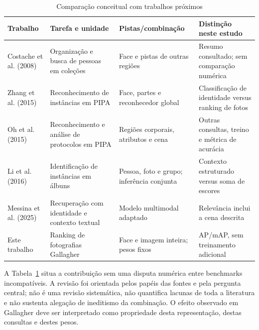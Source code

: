 \begin{table}[htbp]\centering\small
\caption{Comparação conceitual com trabalhos próximos}\label{tab:relacionados}
\begin{tabularx}{\textwidth}{>{\raggedright\arraybackslash}p{2.5cm}*{3}{>{\raggedright\arraybackslash}X}}\toprule
Trabalho & Tarefa e unidade & Pistas/combinação & Distinção neste estudo\\\midrule
Costache et al. (2008) & Organização e busca de pessoas em coleções & Face e pistas de outras regiões & Resumo consultado; sem comparação numérica\\
Zhang et al. (2015) & Reconhecimento de instâncias em PIPA & Face, partes e reconhecedor global & Classificação de identidade versus ranking de fotos\\
Oh et al. (2015) & Reconhecimento e análise de protocolos em PIPA & Regiões corporais, atributos e cena & Outras consultas, treino e métrica de acurácia\\
Li et al. (2016) & Identificação de instâncias em álbuns & Pessoa, foto e grupo; inferência conjunta & Contexto estruturado versus soma de escores\\
Messina et al. (2025) & Recuperação com identidade e contexto textual & Modelo multimodal adaptado & Relevância inclui a cena descrita\\
Este trabalho & Ranking de fotografias Gallagher & Face e imagem inteira; pesos fixos & AP/mAP, sem treinamento adicional\\\bottomrule
\end{tabularx}
\end{table}

A Tabela~\ref{tab:relacionados} situa a contribuição sem uma disputa numérica entre benchmarks incompatíveis. A revisão foi orientada pelos papéis das fontes e pela pergunta central; não é uma revisão sistemática, não quantifica lacunas de toda a literatura e não sustenta alegação de ineditismo da combinação. O efeito observado em Gallagher deve ser interpretado como propriedade desta representação, destas consultas e destes pesos.
